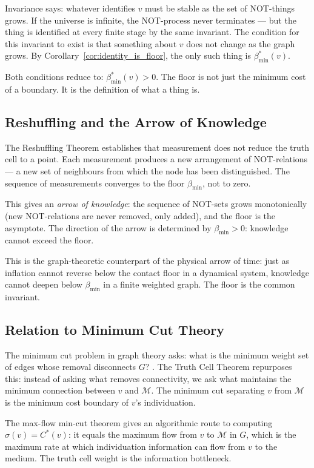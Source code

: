 \documentclass[11pt,twocolumn,a4paper]{article}
\theoremstyle{plain}
\theoremstyle{definition}
\theoremstyle{remark}
\newcommand{\med}{\mathcal{M}}
\newcommand{\bmin}{\beta_{\min}}
\begin{document}
Invariance says: whatever identifies $v$ must be stable as the set of NOT-things
grows. If the universe is infinite, the NOT-process never terminates --- but the
thing is identified at every finite stage by the same invariant. The condition
for this invariant to exist is that something about $v$ does not change as the
graph grows. By Corollary~\ref{cor:identity_is_floor}, the only such thing is
$\bmin^*(v)$.

Both conditions reduce to: $\bmin^*(v) > 0$. The floor is not just the minimum
cost of a boundary. It is the definition of what a thing is.

\subsection{Reshuffling and the Arrow of Knowledge}

The Reshuffling Theorem establishes that measurement does not reduce the
truth cell to a point. Each measurement produces a new arrangement of
NOT-relations --- a new set of neighbours from which the node has been
distinguished. The sequence of measurements converges to the floor $\bmin$,
not to zero.

This gives an \emph{arrow of knowledge}: the sequence of NOT-sets grows
monotonically (new NOT-relations are never removed, only added), and the
floor is the asymptote. The direction of the arrow is determined by
$\bmin > 0$: knowledge cannot exceed the floor.

This is the graph-theoretic counterpart of the physical arrow of time:
just as inflation cannot reverse below the contact floor in a dynamical
system, knowledge cannot deepen below $\bmin$ in a finite weighted graph.
The floor is the common invariant.

\subsection{Relation to Minimum Cut Theory}

The minimum cut problem in graph theory asks: what is the minimum weight
set of edges whose removal disconnects $G$? \citep{ford1956maxflow,
stoer1997simple}. The Truth Cell Theorem repurposes this: instead of
asking what removes connectivity, we ask what maintains the minimum
connection between $v$ and $\med$. The minimum cut separating $v$ from
$\med$ is the minimum cost boundary of $v$'s individuation.

The max-flow min-cut theorem \citep{ford1956maxflow} gives an algorithmic
route to computing $\sigma(v) = C^*(v)$: it equals the maximum flow from
$v$ to $\med$ in $G$, which is the maximum rate at which individuation
information can flow from $v$ to the medium. The truth cell weight is the
information bottleneck.
\end{document}
